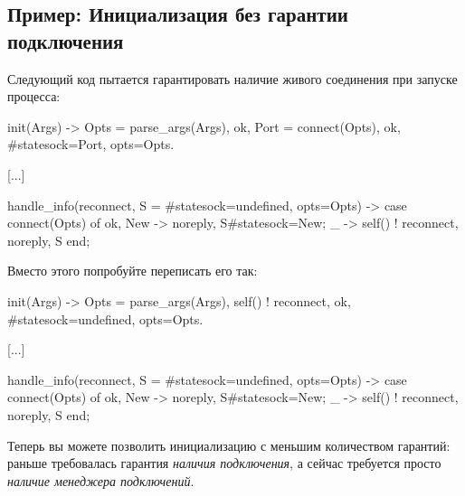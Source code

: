 \subsection{Пример: Инициализация без гарантии подключения}
\label{subsec:start-link-initializing-without-guaranteeing-connections}

Следующий код пытается гарантировать наличие живого соединения при запуске процесса:

\begin{VerbatimText}
init(Args) ->
    Opts = parse_args(Args),
    {ok, Port} = connect(Opts),
    {ok, #state{sock=Port, opts=Opts}}.

[...]

handle_info(reconnect, S = #state{sock=undefined, opts=Opts}) ->
    case connect(Opts) of
        {ok, New} -> {noreply, S#state{sock=New}};
         _ -> self() ! reconnect, {noreply, S}
    end;
\end{VerbatimText}

Вместо этого попробуйте переписать его так:

\begin{VerbatimText}
init(Args) ->
    Opts = parse_args(Args),
    self() ! reconnect,
    {ok, #state{sock=undefined, opts=Opts}}.

[...]

handle_info(reconnect, S = #state{sock=undefined, opts=Opts}) ->
    case connect(Opts) of
        {ok, New} -> {noreply, S#state{sock=New}};
        _ -> self() ! reconnect, {noreply, S}
    end;
\end{VerbatimText}

\sloppy{}
Теперь вы можете позволить инициализацию с меньшим количеством гарантий: раньше требовалась гарантия \emph{наличия подключения}, а сейчас требуется просто \emph{наличие менеджера подключений}.


